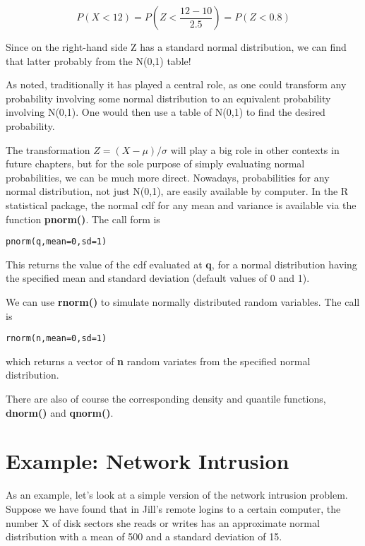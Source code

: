 \begin{equation}
P(X < 12) = P\left (Z < \frac{12-10}{2.5}\right ) = P(Z < 0.8)
\end{equation}

Since on the right-hand side Z has a standard normal distribution,
we can find that latter probably from the N(0,1) table!



As noted, traditionally it has played a central role, as one could
transform any probability involving some normal distribution to an
equivalent probability involving N(0,1).  One would then use a table of
N(0,1) to find the desired probability.

The transformation $Z = (X - \mu)/\sigma$ will play a big role in other
contexts in future chapters, but for the sole purpose of simply
evaluating normal probabilities, we can be much more direct.  Nowadays,
probabilities for any normal distribution, not just N(0,1), are easily
available by computer.  In the R statistical package, the normal cdf for
any mean and variance is available via the function {\bf pnorm()}.  The
call form is

\begin{Verbatim}[fontsize=\relsize{-2}]
pnorm(q,mean=0,sd=1)
\end{Verbatim}

This returns the value of the cdf evaluated at {\bf q}, for a normal
distribution having the specified mean and standard deviation (default
values of 0 and 1).

We can use {\bf rnorm()} to simulate normally distributed random
variables.  The call is 

\begin{Verbatim}[fontsize=\relsize{-2}]
rnorm(n,mean=0,sd=1)
\end{Verbatim}

which returns a vector of {\bf n} random variates from the specified
normal distribution.

There are also of course the corresponding density and quantile
functions, {\bf dnorm()} and {\bf qnorm()}.

\section{Example:  Network Intrusion}
\label{netintrude}

As an example, let's look at a simple version of the network intrusion
problem.  Suppose we have found that in Jill's remote logins to a
certain computer, the number X of disk sectors she reads or writes has
an approximate normal distribution with a mean of 500 and a standard
deviation of 15.

